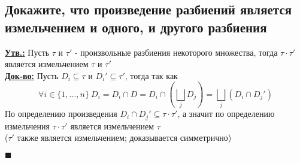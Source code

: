 
\subsection{Докажите, что произведение разбиений является измельчением и одного, и другого разбиения} 

\textbf{\underline{Утв.:} } Пусть $\tau$ и $\tau'$ - произвольные разбиения некоторого множества, тогда $\tau \cdot \tau'$ является измельчением $\tau$ и $\tau'$\\
\textbf{\underline{Док-во:} } Пусть $D_i \subseteq \tau$ и $D_i' \subseteq \tau'$, тогда так как 
\[\forall i \in \{1, ..., n\} \ D_i = D_i \cap D = D_i \cap (\bigsqcup\limits_jD_j) = \bigsqcup\limits_j(D_i\cap D_j')\]
По определению произведения $D_i \cap D_j' \subseteq \tau\cdot\tau'$, а значит по определению измельчения $\tau\cdot\tau'$ является измельчением  $\tau$ \\
($\tau'$ также является измельчением; доказывается симметрично)
\begin{flushright}
$\blacksquare$
\end{flushright}

